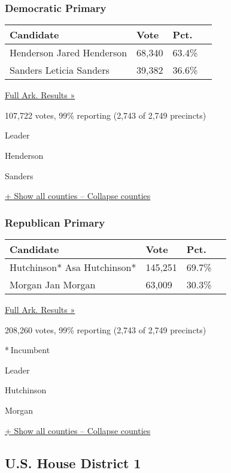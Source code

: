 \hypertarget{democratic-primary}{%
\subsubsection{Democratic Primary}\label{democratic-primary}}

\begin{longtable}[]{@{}llll@{}}
\toprule
Candidate & Vote & Pct. &\tabularnewline
\midrule
\endhead
 Henderson Jared Henderson & 68,340 & 63.4\% &\tabularnewline
 Sanders Leticia Sanders & 39,382 & 36.6\% &\tabularnewline
\bottomrule
\end{longtable}

\href{https://www.nytimes3xbfgragh.onion/elections/results/arkansas}{Full
Ark. Results »}

107,722 votes, 99\% reporting (2,743 of 2,749 precincts)

Leader

 Henderson

 Sanders

\protect\hyperlink{}{+ Show all counties -- Collapse counties}

\hypertarget{republican-primary}{%
\subsubsection{Republican Primary}\label{republican-primary}}

\begin{longtable}[]{@{}llll@{}}
\toprule
Candidate & Vote & Pct. &\tabularnewline
\midrule
\endhead
 Hutchinson* Asa Hutchinson* & 145,251 & 69.7\% &\tabularnewline
 Morgan Jan Morgan & 63,009 & 30.3\% &\tabularnewline
\bottomrule
\end{longtable}

\href{https://www.nytimes3xbfgragh.onion/elections/results/arkansas}{Full
Ark. Results »}

208,260 votes, 99\% reporting (2,743 of 2,749 precincts)

* Incumbent

Leader

 Hutchinson

 Morgan

\protect\hyperlink{}{+ Show all counties -- Collapse counties}

\hypertarget{us-house-district-1}{%
\subsection{U.S. House District 1}\label{us-house-district-1}}


